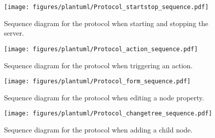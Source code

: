 

\begin{figure}[htbp]  %
  \centering
  \texttt{[image: figures/plantuml/Protocol\_startstop\_sequence.pdf]}
  \caption[Protocol Sequence Diagram of Start/Stop]{Sequence diagram for the protocol when starting and stopping the server.}\label{fig:protocol-startstop}
\end{figure}

\begin{figure}[htbp]  %
  \centering
  \texttt{[image: figures/plantuml/Protocol\_action\_sequence.pdf]}
  \caption[Protocol Sequence Diagram of Action Triggering]{Sequence diagram for the protocol when triggering an action.}\label{fig:protocol-action}
\end{figure}

\begin{figure}[htbp]  %
  \centering
  \texttt{[image: figures/plantuml/Protocol\_form\_sequence.pdf]}
  \caption[Protocol Sequence Diagram of Property Form]{Sequence diagram for the protocol when editing a node property.}\label{fig:protocol-form}
\end{figure}

\begin{figure}[htbp]  %
  \centering
  \texttt{[image: figures/plantuml/Protocol\_changetree\_sequence.pdf]}
  \caption[Protocol Sequence Diagram of Tree Changes]{Sequence diagram for the protocol when adding a child node.}\label{fig:protocol-changetree}
\end{figure}

